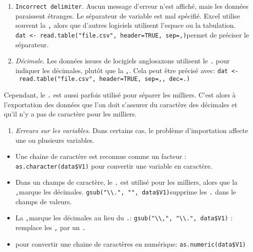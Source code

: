 \documentclass[]{book}
\providecommand{\tightlist}{%
  \setlength{\itemsep}{0pt}\setlength{\parskip}{0pt}}
\begin{document}
\begin{enumerate}
\def\labelenumi{\arabic{enumi}.}
\setcounter{enumi}{1}
\item
  \texttt{Incorrect\ delimiter}. Aucun message d'erreur n'est affiché, mais les données paraissent étranges. Le séparateur de variable est mal spécifié. Excel utilise souvent la \texttt{,} alors que d'autres logiciels utilisent l'espace ou la tabulation.
  \texttt{dat\ \textless{}-\ read.table("file.csv",\ header=TRUE,\ sep=\textquotesingle{},\textquotesingle{})}permet de préciser le séparateur.
\item
  \emph{Décimale}. Les données issues de locigiels anglosaxons utilisent le \texttt{.} pour indiquer les décimales, plutôt que la \texttt{,}. Cela peut être précisé avec: \texttt{dat\ \textless{}-\ read.table("file.csv",\ header=TRUE,\ sep=\textquotesingle{},\textquotesingle{},\ dec=\textquotesingle{}.\textquotesingle{})}
\end{enumerate}

Cependant, le \texttt{.} est aussi parfois utilisé pour séparer les milliers. C'est alors à l'exportation des données que l'on doit s'assurer du caractère des décimales et qu'il n'y a pas de caractère pour les milliers.

\begin{enumerate}
\def\labelenumi{\arabic{enumi}.}
\setcounter{enumi}{3}
\tightlist
\item
  \emph{Erreurs sur les variables}. Dans certains cas, le problème d'importation affecte une ou plusieurs variables.
\end{enumerate}

\begin{itemize}
\tightlist
\item
  Une chaine de caractère est reconnue comme un facteur : \texttt{as.character(data\$V1)} pour convertir une variable en caractère.
\item
  Dans un champs de caractère, le \texttt{.} est utilisé pour les milliers, alors que la \texttt{,}marque les décimales. \texttt{gsub("\textbackslash{}\textbackslash{}.",\ "",\ data\$V1)}supprime les \texttt{.} dans le champs de valeurs.
\item
  La \texttt{,}marque les décimales au lieu du \texttt{.}: \texttt{gsub("\textbackslash{}\textbackslash{},",\ "\textbackslash{}\textbackslash{}.",\ data\$V1)} : remplace les \texttt{,} par un \texttt{.}
\item
  pour convertir une chaine de caractères en numérique: \texttt{as.numeric(data\$V1)}
\end{itemize}
\end{document}
